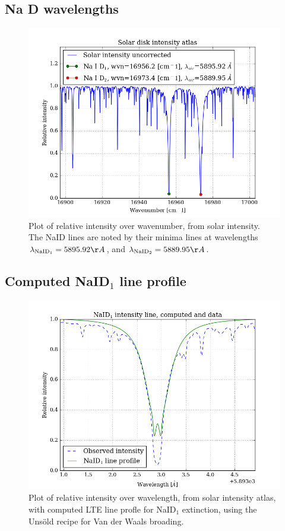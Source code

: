 \documentclass[11pt,a4paper,notitlepage]{article}
\begin{document}
\subsection{Na D wavelengths}
\begin{figure}[H]
\center
	\includegraphics[scale=0.42]{../figs/3vac_wvl_min.png}
	\caption{Plot of relative intensity over wavenumber, from solar intensity.\\
	The NaID lines are noted  by their minima lines at wavelengths $\lambda_{\text{NaID}_1} = 5895.92 \AA$, and $\lambda_{\text{NaID}_2} = 5889.95 \AA$.}
\end{figure}

\subsection{Computed NaID$_1$ line profile}

\begin{figure}[H]
\center
	\includegraphics[scale=0.42]{../figs/3NaDspectrum.png}
	\caption{Plot of relative intensity over wavelength, from solar intensity atlas, with computed LTE line profle for NaID$_1$ extinction, using the Unsöld recipe for Van der Waals broading.}
\end{figure}
\end{document}
